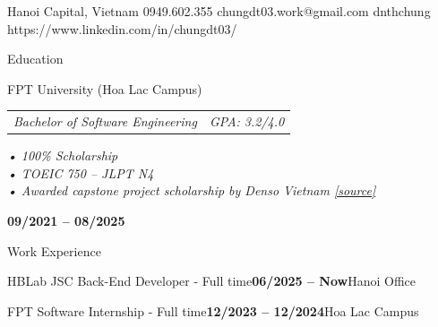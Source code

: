 \documentclass[]{style}
\newcommand{\bolddate}[1]{\textbf{#1}}
\begin{document}
\resumeheader
{Hanoi Capital, Vietnam}
{0949.602.355}
{chungdt03.work@gmail.com}
{dnthchung}
{https://www.linkedin.com/in/chungdt03/}

\begin{section}{Education}
 \begin{subsectionnobulletnolist}
   {FPT University (Hoa Lac Campus)}
   {
     \begin{tabularx}{\linewidth}{@{}lX@{}}
       \textit{Bachelor of Software Engineering} & \hfill\textit{GPA: 3.2/4.0} \\
     \end{tabularx}
     \textit{• 100\% Scholarship} \\
     \textit{• TOEIC 750 -- JLPT N4} \\
     \textit{• Awarded capstone project scholarship by Denso Vietnam \href{https://www.facebook.com/photo/?fbid=1116264387198490&set=pcb.1116286847196244}{[source]}}
   }
   {\bolddate{09/2021 -- 08/2025}}{}
 \end{subsectionnobulletnolist}
\end{section}

\begin{section}
 {Work Experience}
 \begin{subsectionnobulletnolist}
   {HBLab JSC}
   {Back-End Developer - Full time}{\bolddate{06/2025 -- Now}}{Hanoi Office}
 \end{subsectionnobulletnolist}

 \begin{subsectionnobulletnolist}
   {FPT Software}
   {Internship - Full time}{\bolddate{12/2023 -- 12/2024}}{Hoa Lac Campus}
 \end{subsectionnobulletnolist}
\end{section}

\end{document}
